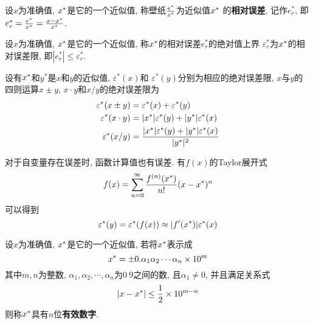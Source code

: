 \bigskip

\begin{relative_error}
    \label{definition:relative_error}
    设$x$为准确值, $x^\ast$是它的一个近似值, 称壁纸$e^\ast\over x^\ast$为近似值$x^\ast$%
    的{\bf 相对误差}, 记作$e^\ast_r$, 即$e^\ast_r = {e^\ast\over x^\ast}={x-x^\ast\over x^\ast}$.
\end{relative_error}

\medskip

\begin{relative_error_limit}
    \label{definition:relative_error_limit}
    设$x$为准确值, $x^\ast$是它的一个近似值, 称$x^\ast$的相对误差$e^\ast_r$的绝对值上界%
    $\varepsilon^\ast_r$为$x^\ast$的相对误差限, 即$|e^\ast_r|\le\varepsilon^\ast_r$.
\end{relative_error_limit}

\medskip

设有$x^\ast$和$y^\ast$是$x$和$y$的近似值, $\varepsilon^\ast(x)$和%
$\varepsilon^\ast(y)$分别为相应的绝对误差限, $x$与$y$的四则运算$x\pm y$, $x\cdot y$和$x/y$的绝对误差限为\hfill\break
\begin{subequations}
    \label{equation:error_limit_arithmetic}
    \index{误差限的四则运算}
    \begin{align}
        \varepsilon^\ast(x\pm y) &= \varepsilon^\ast(x) + \varepsilon^\ast(y)\\
        \varepsilon^\ast(x\cdot y) &= |\astx|\varepsilon^\ast(y) + |y^\ast|\varepsilon^\ast(x)\\
        \varepsilon^\ast(x/y) &= {|\astx|\varepsilon^\ast(y) + |y^\ast|\varepsilon^\ast(x)\over|y^\ast|^2}
    \end{align}
\end{subequations}

对于自变量存在误差时, 函数计算值也有误差. 有$f(x)$的Taylor展开式
\begin{equation*}
    f(x) = \sum_{n=0}^{\infty}{f^{(n)}(x^\ast)\over n!}(x-x^\ast)^n
\end{equation*}
可以得到
\begin{equation*}
    \index{函数值的误差限}
    \varepsilon^\ast(y)=\varepsilon^\ast(f(x))\approx|f^\prime(\astx)|\varepsilon^\ast(x)
\end{equation*}

\bigskip

\begin{significant_digits}
    \label{definition:significant_digits}
    设$x$为准确值, $x^\ast$是它的一个近似值, 若将$x^\ast$表示成
    \begin{equation}
        \label{equation:expression_of_decimal_digit}
        x^\ast = \pm0.\alpha_1\alpha_2\cdots\alpha_n\times10^m
    \end{equation}
    其中$m, n$为整数, $\alpha_1,\alpha_2,\cdots,\alpha_n$为$0~9$之间的数, %
    且$\alpha_1\ne0$, 并且满足关系式
    \begin{equation*}
        |x-x^\ast|\le{1\over2}\times10^{m-n}
    \end{equation*}
    则称$x^\ast$具有$n$位{\bf 有效数字}.
\end{significant_digits}

